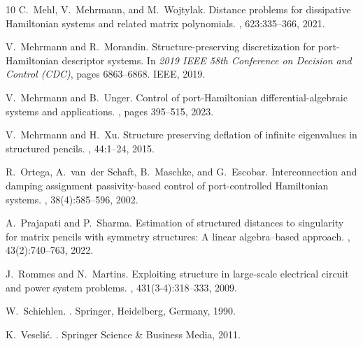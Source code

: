 \documentclass[11pt]{article}
\begin{document}
\begin{thebibliography}{10}
C.~Mehl, V.~Mehrmann, and M.~Wojtylak.
\newblock Distance problems for dissipative {H}amiltonian systems and related
  matrix polynomials.
, 623:335--366, 2021.

V.~Mehrmann and R.~Morandin.
\newblock Structure-preserving discretization for port-{Hamiltonian} descriptor
  systems.
\newblock In {\em 2019 IEEE 58th Conference on Decision and Control (CDC)},
  pages 6863--6868. IEEE, 2019.

V.~Mehrmann and B.~Unger.
\newblock Control of port-{H}amiltonian differential-algebraic systems and
  applications.
, pages 395--515, 2023.

V.~Mehrmann and H.~Xu.
\newblock Structure preserving deflation of infinite eigenvalues in structured
  pencils.
, 44:1--24, 2015.

R.~Ortega, A.~van~der Schaft, B.~Maschke, and G.~Escobar.
\newblock Interconnection and damping assignment passivity-based control of
  port-controlled {H}amiltonian systems.
, 38(4):585--596, 2002.

A.~Prajapati and P.~Sharma.
\newblock Estimation of structured distances to singularity for matrix pencils
  with symmetry structures: A linear algebra--based approach.
,
  43(2):740--763, 2022.

J.~Rommes and N.~Martins.
\newblock Exploiting structure in large-scale electrical circuit and power
  system problems.
, 431(3-4):318--333, 2009.

W.~Schiehlen.
.
\newblock Springer, Heidelberg, Germany, 1990.

K.~Veseli{\'c}.
.
\newblock Springer Science \& Business Media, 2011.

\end{thebibliography}

%
%
\end{document}
